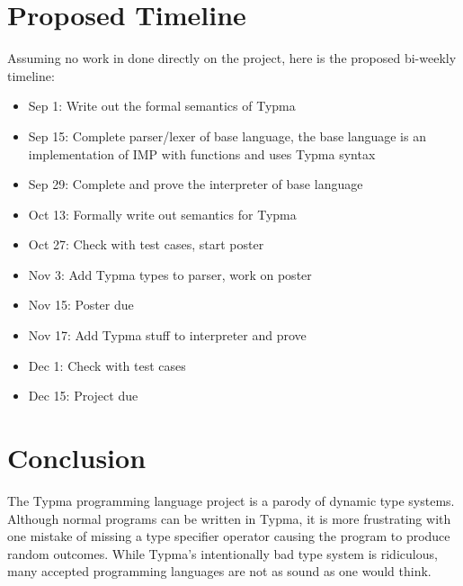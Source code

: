 \documentclass[10pt,twocolumn]{article}
\begin{document}
\section{Proposed Timeline}

Assuming no work in done directly on the project, here is the proposed bi-weekly timeline:

\begin{itemize}

\item Sep 1: Write out the formal semantics of Typma

\item Sep 15: Complete parser/lexer of base language, the base language is an implementation of IMP with functions and uses Typma syntax

\item Sep 29: Complete and prove the interpreter of base language

\item Oct 13: Formally write out semantics for Typma

\item Oct 27: Check with test cases, start poster

\item Nov 3: Add Typma types to parser, work on poster

\item Nov 15: Poster due

\item Nov 17: Add Typma stuff to interpreter and prove

\item Dec 1: Check with test cases

\item Dec 15: Project due

\end{itemize}

\section{Conclusion}

The Typma programming language project is a parody of dynamic type systems. Although normal programs can be written in Typma, it is more frustrating with one mistake of missing a type specifier operator causing the program to produce random outcomes. While Typma's intentionally bad type system is ridiculous, many accepted programming languages are not as sound as one would think.

\printbibliography 
\end{document}
